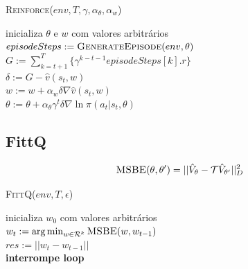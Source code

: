 \documentclass[letterpaper]{article}
\begin{document}
\linesnumbered
\dontprintsemicolon
\begin{algorithm}[t!]
{
	\caption{\textsc{Reinforce}($ env, T, \gamma, \alpha_{\theta}, \alpha_{w} $)}
	\label{alg:reinforce_baseline}
    inicializa $ \theta $ e $ w $ com valores arbitrários \\

    {
      $episodeSteps := \textsc{GenerateEpisode}(env, \theta)$\\

      {
        $G := \sum_{k = t+1}^T \{ \gamma^{k-t-1} episodeSteps[k].r \}$\\
        $ \delta := G - \hat{v}(s_t, w) $\\
        $ w := w + \alpha_w \delta \nabla \hat{v}(s_t, w) $\\
        $ \theta := \theta + \alpha_{\theta} \gamma^t \delta \nabla \ln \pi(a_t|s_t, \theta) $
      }
    }
}
\end{algorithm}

\subsection{FittQ}


\begin{equation} \label{eq:msbe}
  \textsc{MSBE}(\theta, \theta') = || \hat{V}_{\theta} - \mathcal{T} \hat{V}_{\theta'} ||^2_D
\end{equation}

\linesnumbered
\dontprintsemicolon
\begin{algorithm}[t!]
{
	\caption{\textsc{FittQ}($ env, T, \epsilon $)}
	\label{alg:reinforce}
    inicializa $ w_0 $ com valores arbitrários \\

    {
      $w_t := \arg \min_{w \in \mathcal{R}^k} \textsc{MSBE}(w, w_{t-1}) $ \\
      $res := || w_t - w_{t-1} ||$ \\

      {
        \textbf{interrompe loop}
      }
    }
}
\end{algorithm}
\end{document}
